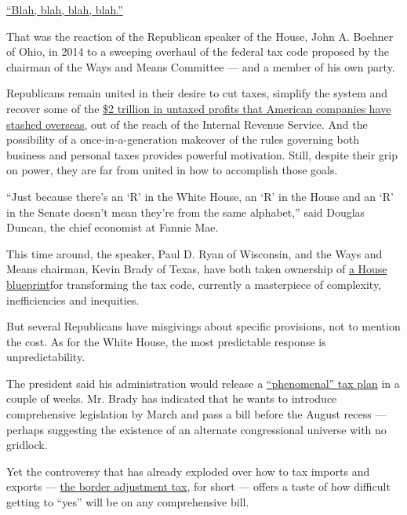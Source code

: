 \href{https://www.nytimes.com/2014/02/27/us/politics/sweeping-tax-overhaul-plan-would-bring-big-changes.html?_r=0}{``Blah,
blah, blah, blah.''}

That was the reaction of the Republican speaker of the House, John A.
Boehner of Ohio, in 2014 to a sweeping overhaul of the federal tax code
proposed by the chairman of the Ways and Means Committee --- and a
member of his own party.

Republicans remain united in their desire to cut taxes, simplify the
system and recover some of the
\href{https://www.nytimes.com/2016/11/06/your-money/strategies-corporate-cash-repatriation-bipartisan-consensuss.html}{\$2
trillion in untaxed profits that American companies have stashed
overseas,} out of the reach of the Internal Revenue Service. And the
possibility of a once-in-a-generation makeover of the rules governing
both business and personal taxes provides powerful motivation. Still,
despite their grip on power, they are far from united in how to
accomplish those goals.

``Just because there's an `R' in the White House, an `R' in the House
and an `R' in the Senate doesn't mean they're from the same alphabet,''
said Douglas Duncan, the chief economist at Fannie Mae.

This time around, the speaker, Paul D. Ryan of Wisconsin, and the Ways
and Means chairman, Kevin Brady of Texas, have both taken ownership of
\href{https://abetterway.speaker.gov/_assets/pdf/ABetterWay-Tax-PolicyPaper.pdf}{a
House blueprint}for transforming the tax code, currently a masterpiece
of complexity, inefficiencies and inequities.

But several Republicans have misgivings about specific provisions, not
to mention the cost. As for the White House, the most predictable
response is unpredictability.

The president said his administration would release a
\href{https://www.nytimes.com/video/business/dealbook/100000004922130/trump-on-phenomenal-tax-plan.html}{``phenomenal''
tax plan} in a couple of weeks. Mr. Brady has indicated that he wants to
introduce comprehensive legislation by March and pass a bill before the
August recess --- perhaps suggesting the existence of an alternate
congressional universe with no gridlock.

Yet the controversy that has already exploded over how to tax imports
and exports ---
\href{https://www.nytimes.com/reuters/2017/02/03/us/politics/03reuters-usa-tax-border.html}{the
border adjustment tax}, for short --- offers a taste of how difficult
getting to ``yes'' will be on any comprehensive bill.

